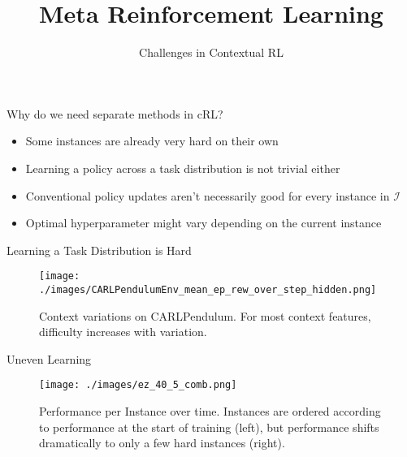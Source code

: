 \documentclass[aspectratio=169]{../latex_main/tntbeamer}  %
\title[Meta-RL]{Meta Reinforcement Learning}
\subtitle{Challenges in Contextual RL}
\begin{document}
	
	\maketitle


\begin{frame}[c]{Why do we need separate methods in cRL?}

\begin{itemize}
	\item Some instances are already very hard on their own
	\item Learning a policy across a task distribution is not trivial either
	\item Conventional policy updates aren't necessarily good for every instance in $\mathcal{I}$
	\item Optimal hyperparameter might vary depending on the current instance
\end{itemize}


\end{frame}
\begin{frame}[c]{Learning a Task Distribution is Hard}
	
\begin{figure}
    \centering
    \texttt{[image: ./images/CARLPendulumEnv\_mean\_ep\_rew\_over\_step\_hidden.png]}
    \caption{Context variations on CARLPendulum. For most context features, difficulty increases with variation.}
    \label{fig:my_label}
\end{figure}
	
\end{frame}
\begin{frame}[c]{Uneven Learning}
	
\begin{figure}
    \centering
    \texttt{[image: ./images/ez\_40\_5\_comb.png]}
    \caption{Performance per Instance over time. Instances are ordered according to performance at the start of training (left), but performance shifts dramatically to only a few hard instances (right).}
    \label{fig:my_label}
\end{figure}
	
\end{frame}
\end{document}
